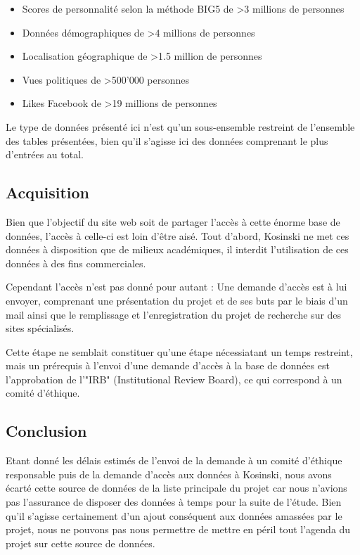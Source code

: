 		\begin{itemize}
			\item Scores de personnalité selon la méthode BIG5 de >3 millions de personnes
			\item Données démographiques de >4 millions de personnes
			\item Localisation géographique de >1.5 million de personnes
			\item Vues politiques de >500'000 personnes
			\item Likes Facebook de >19 millions de personnes
		\end{itemize}

		Le type de données présenté ici n'est qu'un sous-ensemble restreint de l'ensemble des tables présentées, bien qu'il s'agisse ici des données comprenant le plus d'entrées au total.

	\subsection{Acquisition}

		Bien que l'objectif du site web soit de partager l'accès à cette énorme base de données, l'accès à celle-ci est loin d'être aisé. Tout d'abord, Kosinski ne met ces données à disposition que de milieux académiques, il interdit l'utilisation de ces données à des fins commerciales.

		Cependant l'accès n'est pas donné pour autant : Une demande d'accès est à lui envoyer, comprenant une présentation du projet et de ses buts par le biais d'un mail ainsi que le remplissage et l'enregistration du projet de recherche sur des sites spécialisés.

		Cette étape ne semblait constituer qu'une étape nécessiatant un temps restreint, mais un prérequis à l'envoi d'une demande d'accès à la base de données est l'approbation de l'"IRB" (Institutional Review Board), ce qui correspond à un comité d'éthique.

	\subsection{Conclusion}

		Etant donné les délais estimés de l'envoi de la demande à un comité d'éthique responsable puis de la demande d'accès aux données à Kosinski, nous avons écarté cette source de données de la liste principale du projet car nous n'avions pas l'assurance de disposer des données à temps pour la suite de l'étude. Bien qu'il s'agisse certainement d'un ajout conséquent aux données amassées par le projet, nous ne pouvons pas nous permettre de mettre en péril tout l'agenda du projet sur cette source de données.

